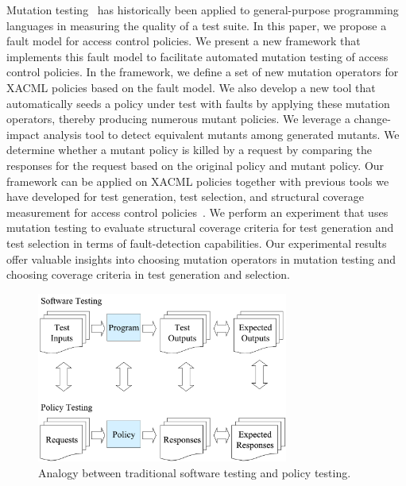 Mutation testing~\cite{demillo78:hints} has historically been
applied to general-purpose programming languages in measuring the
quality of a test suite. In this paper, we propose a fault model for
access control policies. We present a new framework that implements
this fault model to facilitate automated mutation testing of access
control policies. In the framework, we define a set of new mutation
operators for XACML policies based on the fault model. We also
develop a new tool that automatically seeds a policy under test with
faults by applying these mutation operators, thereby producing
numerous mutant policies. We leverage a change-impact analysis tool
to detect equivalent mutants among generated mutants. We determine
whether a mutant policy is killed by a request by comparing the
responses for the request based on the original policy and mutant
policy. Our framework can be applied on XACML policies together with
previous tools we have developed for test generation, test
selection, and structural coverage measurement for access control
policies~\cite{martin06:defining, martin07:automated,
martin06:inferring}. We perform an experiment that uses mutation
testing to evaluate structural coverage criteria for test generation
and test selection in terms of fault-detection capabilities. Our
experimental results offer valuable insights into choosing mutation
operators in mutation testing and choosing coverage criteria in test
generation and selection.

\begin{figure}[t]
    \centering
        \includegraphics[width=3.25in]{policy-test}
    \caption{\label{fig:policy-test}Analogy between traditional software testing and policy testing.}
\end{figure}
